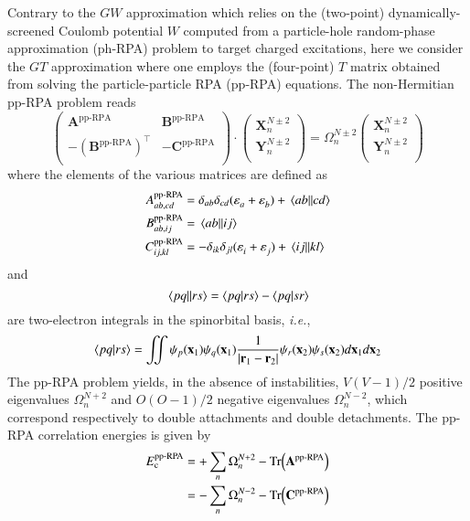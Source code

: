 \documentclass[aip,jcp,reprint,noshowkeys,superscriptaddress]{revtex4-1}
\newcommand{\ie}{\textit{i.e.}}
\newcommand{\T}[1]{#1^{\intercal}}
\newcommand{\br}{\mathbf{r}}
\newcommand{\bx}{\mathbf{x}}
\newcommand{\ppRPA}{\text{pp-RPA}}
\newcommand{\Ec}{E_\text{c}}
\newcommand{\e}[2]{\eps_{#1}^{#2}}
\newcommand{\Om}[2]{\Omega_{#1}^{#2}}
\newcommand{\SO}[1]{\psi_{#1}}
\newcommand{\bA}[2]{\mathbf{A}_{#1}^{#2}}
\newcommand{\bB}[2]{\mathbf{B}_{#1}^{#2}}
\newcommand{\bC}[2]{\mathbf{C}_{#1}^{#2}}
\newcommand{\bX}[2]{\mathbf{X}_{#1}^{#2}}
\newcommand{\bY}[2]{\mathbf{Y}_{#1}^{#2}}
\newcommand{\eps}{\varepsilon}
\begin{document}
Contrary to the $GW$ approximation which relies on the (two-point) dynamically-screened Coulomb potential $W$ computed from a particle-hole random-phase approximation (ph-RPA) problem to target charged excitations, here we consider the $GT$ approximation where one employs the (four-point) $T$ matrix obtained from solving the particle-particle RPA (pp-RPA) equations.
The non-Hermitian pp-RPA problem reads
\begin{equation}
\label{eq:LR-RPA}
	\begin{pmatrix}
		\bA{}{\ppRPA}			&	\bB{}{\ppRPA}	\\
		-\T{(\bB{}{\ppRPA})}	&	-\bC{}{\ppRPA}	\\
	\end{pmatrix}
	\cdot
	\begin{pmatrix}
		\bX{n}{N\pm2}	\\
		\bY{n}{N\pm2}	\\
	\end{pmatrix}
	=
	\Om{n}{N\pm2}
	\begin{pmatrix}
		\bX{n}{N\pm2}	\\
		\bY{n}{N\pm2}	\\
	\end{pmatrix}
\end{equation}
where the elements of the various matrices are defined as
\begin{subequations}
\begin{align}
	A_{ab,cd}^{\ppRPA} & = \delta_{ab} \delta_{cd} (\e{a}{} + \e{b}{}) + \mel{ab}{}{cd}
	\\ 
	B_{ab,ij}^{\ppRPA} & = \mel{ab}{}{ij}
	\\ 
	C_{ij,kl}^{\ppRPA} & = - \delta_{ik} \delta_{jl} (\e{i}{} + \e{j}{}) +\mel{ij}{}{kl}
\end{align}
\end{subequations}
and 
\begin{equation}
	\mel{pq}{}{rs} = \braket{pq}{rs} - \braket{pq}{sr}
\end{equation}
are two-electron integrals in the spinorbital basis, \ie,
\begin{equation}
	\braket{pq}{rs} = \iint \SO{p}(\bx_1) \SO{q}(\bx_1) \frac{1}{\abs{\br_1 - \br_2}} \SO{r}(\bx_2) \SO{s}(\bx_2)  d\bx_1 d\bx_2
\end{equation}
The pp-RPA problem yields, in the absence of instabilities, $V(V-1)/2$ positive eigenvalues $\Om{n}{N+2}$ and $O(O-1)/2$ negative eigenvalues $\Om{n}{N-2}$, which  correspond respectively to double attachments and double detachments.
The pp-RPA correlation energies is given by \cite{Peng_2013,Scuseria_2013}
\begin{equation}
\begin{split}
	\Ec^\ppRPA 
	& = + \sum_n \Om{n}{N+2} - \Tr(\bA{}{\ppRPA}) 
	\\
	& = - \sum_n \Om{n}{N-2} - \Tr(\bC{}{\ppRPA})
\end{split}
\end{equation}
\end{document}
